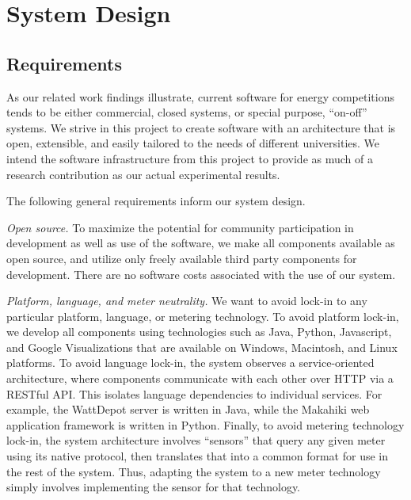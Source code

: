 
\section{System Design}
\label{sec:system-design}

\subsection{Requirements}

As our related work findings illustrate, current software for energy
competitions tends to be either commercial, closed systems, or special
purpose, ``on-off'' systems.  We strive in this project to create
software with an architecture that is open, extensible, and easily tailored
to the needs of different universities.  We intend the software
infrastructure from this project to provide as much of a research
contribution as our actual experimental results.

The following general requirements inform our system design.

{\em Open source.}  To maximize the potential for community
participation in development as well as use of the software, we make
all components available as open source, and utilize only freely
available third party components for development.  There are no software
costs associated with the use of our system.

{\em Platform, language, and meter neutrality.}  We want to avoid lock-in
to any particular platform, language, or metering technology.  To avoid
platform lock-in, we develop all components using technologies such as
Java, Python, Javascript, and Google Visualizations that are available on
Windows, Macintosh, and Linux platforms.  To avoid language lock-in, the
system observes a service-oriented architecture, where components
communicate with each other over HTTP via a RESTful API.  This isolates
language dependencies to individual services.  For example, the WattDepot
server is written in Java, while the Makahiki web application framework is
written in Python.  Finally, to avoid metering technology lock-in, the
system architecture involves ``sensors'' that query any given meter using
its native protocol, then translates that into a common format for use in
the rest of the system.  Thus, adapting the system to a new meter
technology simply involves implementing the sensor for that technology.

